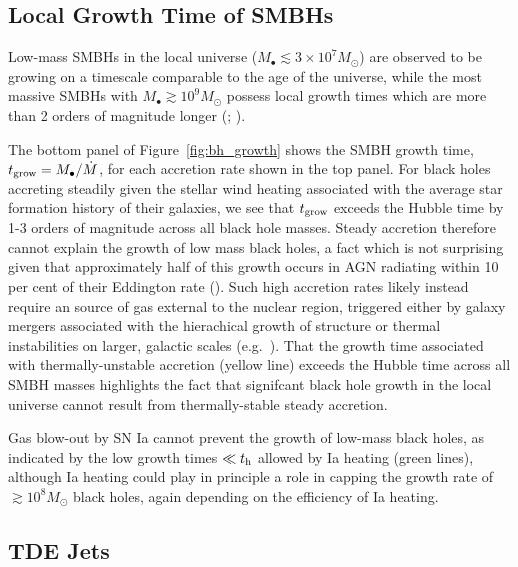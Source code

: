 \documentclass[usenatbib,fleqn]{mn2e}
\begin{document}
\subsection{Local Growth Time of SMBHs }
\label{sec:growth}

Low-mass SMBHs in the local universe ($M_{\bullet} \lesssim 3\times
10^{7}M_{\odot}$) are observed to be growing on a timescale comparable
to the age of the universe, while the most massive SMBHs with
$M_{\bullet} \gtrsim 10^{9}M_{\odot}$ possess local growth times which
are more than 2 orders of magnitude longer (\citealt{Heckman+04};
\citealt{Kauffmann&Heckman09}).

The bottom panel of Figure~\ref{fig:bh_growth} shows the SMBH growth
time, $t_{\rm grow} = M_{\bullet}/\dot{M}$, for each accretion rate
shown in the top panel.  For black holes accreting steadily given the
stellar wind heating associated with the average star formation
history of their galaxies, we see that $t_{\rm grow}$ exceeds the
Hubble time by 1-3 orders of magnitude across all black hole masses.
Steady accretion therefore cannot explain the growth of low mass black
holes, a fact which is not surprising given that approximately half of
this growth occurs in AGN radiating within 10 per cent of their
Eddington rate (\citealt{Heckman+04}).  Such high accretion rates
likely instead require an source of gas external to the nuclear
region, triggered either by galaxy mergers associated with the
hierachical growth of structure or thermal instabilities on larger,
galactic scales (e.g.~\citealt{Ciotti+10}).  That the growth time
associated with thermally-unstable accretion (yellow line) exceeds the
Hubble time across all SMBH masses highlights the fact that signifcant
black hole growth in the local universe cannot result from
thermally-stable steady accretion.

Gas blow-out by SN Ia cannot prevent the growth of low-mass black
holes, as indicated by the low growth times $\ll t_{\rm h}$ allowed by
Ia heating (green lines), although Ia heating could play in principle
a role in capping the growth rate of $\gtrsim 10^{8}M_{\odot}$ black
holes, again depending on the efficiency of Ia heating.

\subsection{TDE Jets}
\label{sec:TDE}
\end{document}

